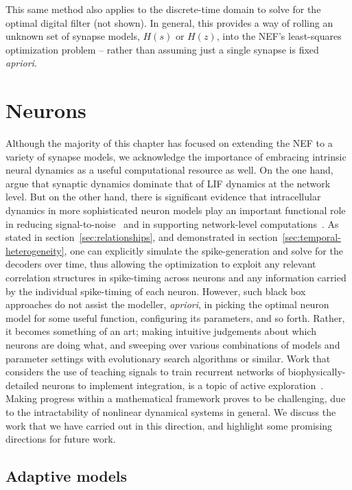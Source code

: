 This same method also applies to the discrete-time domain to solve for the optimal digital filter (not shown).
In general, this provides a way of rolling an unknown set of synapse models, $H(s)$ or $H(z)$, into the NEF's least-squares optimization problem -- rather than assuming just a single synapse is fixed \emph{apriori}.


\section{Neurons}
\label{sec:neurons}

Although the majority of this chapter has focused on extending the NEF to a variety of synapse models,
we acknowledge the importance of embracing intrinsic neural dynamics as a useful computational resource as well.
On the one hand, \citet[][appendix~F.1]{eliasmith2003a} argue that synaptic dynamics dominate that of LIF dynamics at the network level.
But on the other hand, there is significant evidence that intracellular dynamics in more sophisticated neuron models play an important functional role in reducing signal-to-noise~\citep[][chapter~4]{eliasmith2003a} and in supporting network-level computations~\citep{izhikevich2007dynamical}.
As stated in section~\ref{sec:relationships}, and demonstrated in section~\ref{sec:temporal-heterogeneity}, one can explicitly simulate the spike-generation and solve for the decoders over time, thus allowing the optimization to exploit any relevant correlation structures in spike-timing across neurons and any information carried by the individual spike-timing of each neuron.
However, such black box approaches do not assist the modeller, \emph{apriori}, in picking the optimal neuron model for some useful function, configuring its parameters, and so forth.
Rather, it becomes something of an art; making intuitive judgements about which neurons are doing what, and sweeping over various combinations of models and parameter settings with evolutionary search algorithms or similar.
Work that considers the use of teaching signals to train recurrent networks of biophysically-detailed neurons to implement integration, is a topic of active exploration~\citep{duggins2017incorporating, duggins2017b}.
Making progress within a mathematical framework proves to be challenging, due to the intractability of nonlinear dynamical systems in general.
We discuss the work that we have carried out in this direction, and highlight some promising directions for future work.

\subsection{Adaptive models}
\label{sec:adaptive-neurons}

